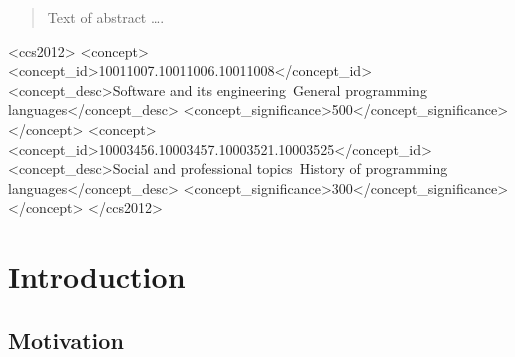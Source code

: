 \documentclass[sigplan,review,anonymous]{acmart}\settopmatter{printfolios=true,printccs=false,printacmref=false}
\begin{document}
\begin{abstract}
Text of abstract \ldots.
\end{abstract}


\begin{CCSXML}
<ccs2012>
<concept>
<concept_id>10011007.10011006.10011008</concept_id>
<concept_desc>Software and its engineering~General programming languages</concept_desc>
<concept_significance>500</concept_significance>
</concept>
<concept>
<concept_id>10003456.10003457.10003521.10003525</concept_id>
<concept_desc>Social and professional topics~History of programming languages</concept_desc>
<concept_significance>300</concept_significance>
</concept>
</ccs2012>
\end{CCSXML}





\maketitle


\section{Introduction}

\subsection{Motivation}
\end{document}
